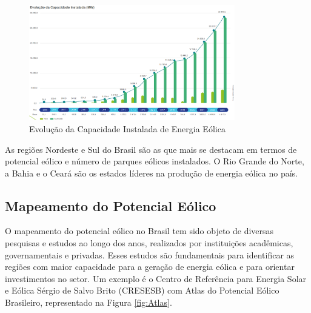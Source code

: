 \begin{figure}[H]
    \caption{Evolução da Capacidade Instalada de Energia Eólica}
    \label{fig:evolucaoCapacidadeInstalada}
    \centering
    \includegraphics[width=0.8\textwidth]{Figuras/Teorico/evolução da capacidade instalada.png}
\end{figure}

\par As regiões Nordeste e Sul do Brasil são as que mais se destacam em termos de potencial eólico e número de parques eólicos instalados. O Rio Grande do Norte, a Bahia e o Ceará são os estados líderes na produção de energia eólica no país.

\subsection{Mapeamento do Potencial Eólico}

\par O mapeamento do potencial eólico no Brasil tem sido objeto de diversas pesquisas e estudos ao longo dos anos, realizados por instituições acadêmicas, governamentais e privadas. Esses estudos são fundamentais para identificar as regiões com maior capacidade para a geração de energia eólica e para orientar investimentos no setor. Um exemplo é o Centro de Referência para Energia Solar e Eólica Sérgio de Salvo Brito (CRESESB) com Atlas do Potencial Eólico Brasileiro, representado na Figura \ref{fig:Atlas}.

